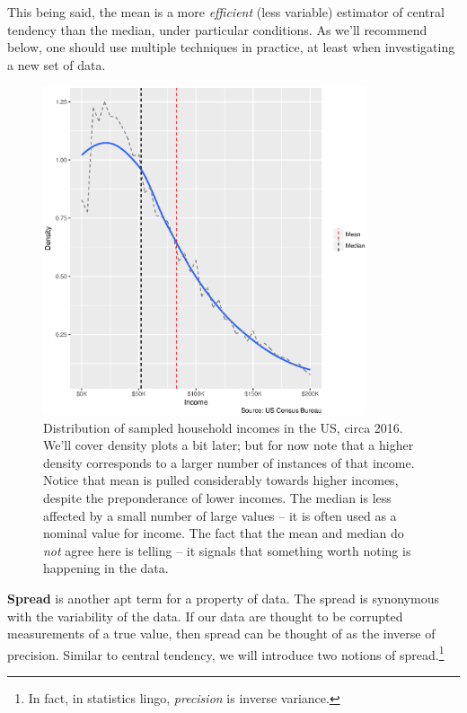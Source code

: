 \documentclass[../primer.tex]{subfiles}
\begin{document}
This being said, the mean is a more \emph{efficient} (less variable) estimator
of central tendency than the median, under particular
conditions.\cite{mosteller1977data} As we'll recommend below, one should use
multiple techniques in practice, at least when investigating a new set of data.

\begin{figure}[!ht]
  \centering
  \includegraphics[width=0.85\textwidth]{./images/income}

  \caption{Distribution of sampled household incomes in the US, circa 2016.
    We'll cover density plots a bit later; but for now note that a higher
    density corresponds to a larger number of instances of that income. Notice
    that mean is pulled considerably towards higher incomes, despite the
    preponderance of lower incomes. The median is less affected by a small
    number of large values -- it is often used as a nominal value for income.
    The fact that the mean and median do \emph{not} agree here is telling -- it
    signals that something worth noting is happening in the data.}
  \label{fig:income-median}
\end{figure}


\textbf{Spread} is another apt term for a property of data. The spread is
synonymous with the variability of the data. If our data are thought to be
corrupted measurements of a true value, then spread can be thought of as the
inverse of precision. Similar to central tendency, we will introduce two notions
of spread.\footnote{In fact, in statistics lingo, \emph{precision} is inverse
  variance.}
\end{document}
